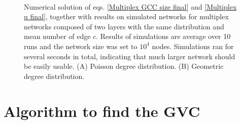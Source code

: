 \documentclass[
11pt, %
english, %
singlespacing, %
nolistspacing, %
liststotoc, %
headsepline, %
]{MastersDoctoralThesis} %
\begin{document}
{
\begin{figure}
	\\
	\caption{Numerical solution of eqs. \eqref{Multiplex GCC size final} and \eqref{Multiplex u final}, together with results on simulated networks for multiplex networks composed of two layers with the same distribution and mean number of edge $c$. Results of simulations are average over 10 runs and the network size was set to $10^4$ nodes. Simulations ran for several seconds in total, indicating that much larger network should be easily usable. (A) Poisson degree distribution. (B) Geometric degree distribution.}
\end{figure}
}


\section{Algorithm to find the GVC}
\end{document}
